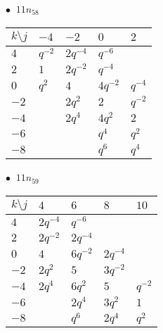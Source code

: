 \begin{minipage}{\linewidth}
$\bullet\ $ $11n_{58}$ \vspace{0.5em} \\
\begin{tabular}{l|llll}
$k \setminus j$ & $-4$ & $-2$ & $0$ & $2$ \\
\hline
$4$ & $q^{-2}$ & $2q^{-4}$ & $q^{-6}$ &  \\
$2$ & $1$ & $2q^{-2}$ & $q^{-4}$ &  \\
$0$ & $q^{2}$ & $4$ & $4q^{-2}$ & $q^{-4}$ \\
$-2$ &  & $2q^{2}$ & $2$ & $q^{-2}$ \\
$-4$ &  & $2q^{4}$ & $4q^{2}$ & $2$ \\
$-6$ &  &  & $q^{4}$ & $q^{2}$ \\
$-8$ &  &  & $q^{6}$ & $q^{4}$ \\
\end{tabular}
\vspace{2em}
\end{minipage}
%
\begin{minipage}{\linewidth}
$\bullet\ $ $11n_{59}$ \vspace{0.5em} \\
\begin{tabular}{l|llll}
$k \setminus j$ & $4$ & $6$ & $8$ & $10$ \\
\hline
$4$ & $2q^{-4}$ & $q^{-6}$ &  &  \\
$2$ & $2q^{-2}$ & $2q^{-4}$ &  &  \\
$0$ & $4$ & $6q^{-2}$ & $2q^{-4}$ &  \\
$-2$ & $2q^{2}$ & $5$ & $3q^{-2}$ &  \\
$-4$ & $2q^{4}$ & $6q^{2}$ & $5$ & $q^{-2}$ \\
$-6$ &  & $2q^{4}$ & $3q^{2}$ & $1$ \\
$-8$ &  & $q^{6}$ & $2q^{4}$ & $q^{2}$ \\
\end{tabular}
\vspace{2em}
\end{minipage}
%
